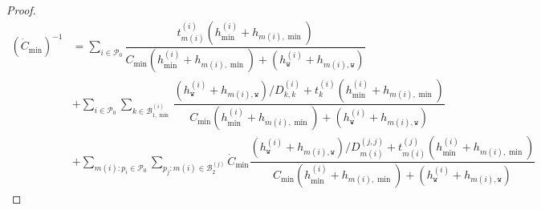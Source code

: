\documentclass{article}
\begin{document}
\begin{proof}
    
    \begin{align*}
       (\dot{C}_{\min})^{-1
        }&=  \sum_{i\in\mathcal{P}_{0}} \dfrac{ t^{(i)}_{m(i)}(h^{(i)}_{\min}+h_{m(i),\min})}{ C_{\min}(h^{(i)}_{\min}+h_{m(i),\min})+(h^{(i)}_{\texttt{w}}+h_{m(i),\texttt{w}})} \\
        &+\sum_{i\in\mathcal{P}_{0}} \sum_{k\in \mathcal{B}_{1,\min}^{(i)}}\dfrac{(h^{(i)}_{\texttt{w}}+h_{m(i),\texttt{w}})/D^{(i)}_{k,k}+t^{(i)}_k(h^{(i)}_{\min}+h_{m(i),\min})}{ C_{\min}(h^{(i)}_{\min}+h_{m(i),\min})+(h^{(i)}_{\texttt{w}}+h_{m(i),\texttt{w}})}\\
        &+\sum_{m(i):p_i\in \mathcal{P}_{0}}\sum_{p_j:m(i)\in \mathcal{B}_2^{(j)}} \dot{C}_{\min}\dfrac{(h^{(i)}_{\texttt{w}}+h_{m(i),\texttt{w}})/D^{(j,j)}_{m(i)}+t^{(j)}_{m(i)}(h^{(i)}_{\min}+h_{m(i),\min})}{ C_{\min}(h^{(i)}_{\min}+h_{m(i),\min})+(h^{(i)}_{\texttt{w}}+h_{m(i),\texttt{w}})}
\end{align*}
\end{proof}
\end{document}
